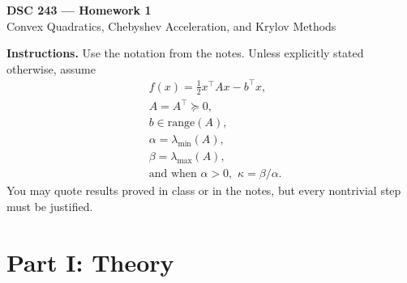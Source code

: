 \documentclass[11pt]{article}
\begin{document}
\begin{center}
{\Large \textbf{DSC 243 --- Homework 1}} \\
\vspace{0.5em}
{\large Convex Quadratics, Chebyshev Acceleration, and Krylov Methods}
\end{center}

\textbf{Instructions.}
Use the notation from the notes. Unless explicitly stated otherwise, assume
\begin{align*}
&f(x) = \frac{1}{2} x^\top A x - b^\top x,\\
&A = A^\top \succeq 0,\\
&b \in \mathrm{range}(A),\\
&\alpha = \lambda_{\min}(A),\\
&\beta = \lambda_{\max}(A),\\
&\text{and when } \alpha > 0,\,\, \kappa = \beta/\alpha.
\end{align*}
You may quote results proved in class or in the notes, but every nontrivial step must be justified.

\section*{Part I: Theory}
\end{document}
